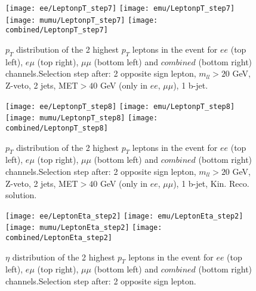 \documentclass[12pt, a4paper, titlepage]{article}
\begin{document}
\begin{figure}
  \texttt{[image: ee/LeptonpT\_step7]}
  \texttt{[image: emu/LeptonpT\_step7]}\\
  \texttt{[image: mumu/LeptonpT\_step7]}
  \texttt{[image: combined/LeptonpT\_step7]}
\caption{$p_T$ distribution of the 2 highest $p_T$ leptons in the event for $ee$ (top left), $e\mu$ (top right), $\mu\mu$ (bottom left) and $combined$ (bottom right) channels.\newline Selection step after: 2 opposite sign lepton, $m_{ll}>20$ GeV, Z-veto, 2 jets, MET$>40$ GeV (only in $ee$, $\mu\mu$), 1 b-jet.}
\end{figure}

\clearpage
\newpage


\begin{figure}
  \texttt{[image: ee/LeptonpT\_step8]}
  \texttt{[image: emu/LeptonpT\_step8]}\\
  \texttt{[image: mumu/LeptonpT\_step8]}
  \texttt{[image: combined/LeptonpT\_step8]}
\caption{$p_T$ distribution of the 2 highest $p_T$ leptons in the event for $ee$ (top left), $e\mu$ (top right), $\mu\mu$ (bottom left) and $combined$ (bottom right) channels.\newline Selection step after: 2 opposite sign lepton, $m_{ll}>20$ GeV, Z-veto, 2 jets, MET$>40$ GeV (only in $ee$, $\mu\mu$), 1 b-jet, Kin. Reco. solution.}
\end{figure}

\clearpage
\newpage





\begin{figure}
  \texttt{[image: ee/LeptonEta\_step2]}
  \texttt{[image: emu/LeptonEta\_step2]}\\
  \texttt{[image: mumu/LeptonEta\_step2]}
  \texttt{[image: combined/LeptonEta\_step2]}
\caption{$\eta$ distribution of the 2 highest $p_T$ leptons in the event for $ee$ (top left), $e\mu$ (top right), $\mu\mu$ (bottom left) and $combined$ (bottom right) channels.\newline Selection step after: 2 opposite sign lepton.}
\end{figure}
\end{document}
